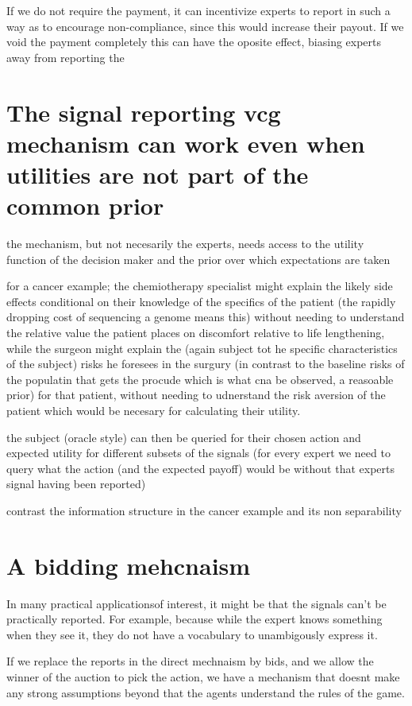 If we do not require the payment, it can incentivize experts to report in such a way as to encourage non-compliance, since this would increase their payout.
If we void the payment completely this can have the oposite effect, biasing experts away from reporting the 






\section{The signal reporting vcg mechanism can work even when utilities are not part of the common prior}

the mechanism, but not necesarily the experts, needs access to the utility function of the decision maker and the prior over which expectations are taken 

for a cancer example; the chemiotherapy specialist might explain the likely side effects conditional on their knowledge of the specifics of the patient (the rapidly dropping cost of sequencing a genome means this) without needing to understand the relative value the patient places on discomfort relative to life lengthening, while the surgeon might explain the (again subject tot he specific characteristics of the subject) risks he foresees in the surgury (in contrast to the baseline risks of the populatin that gets the procude which is what cna be observed, a reasoable prior) for that patient, without needing to udnerstand the risk aversion of the patient which would be necesary for calculating their utility.

the subject (oracle style) can then be queried for their chosen action and expected utility for different subsets of the signals (for every expert we need to query what the action (and the expected payoff) would be without that experts signal having been reported)

contrast the information structure in the cancer example and its non separability 


\section{A bidding mehcnaism }

In many practical applicationsof interest, it might be that the signals can't be practically reported. For example, because while the expert knows something when they see it, they do not have a vocabulary to unambigously express it. 


If we replace the reports in the direct mechnaism by bids, and we allow the winner of the auction to pick the action, we have a mechanism that doesnt make any strong assumptions beyond that the agents understand the rules of the game.

